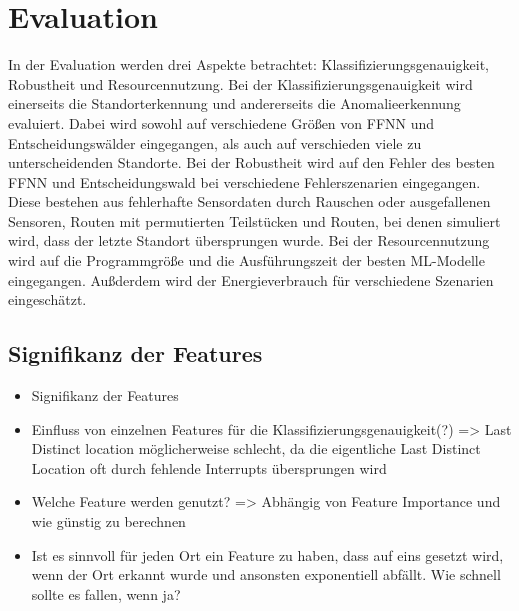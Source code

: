 \chapter{Evaluation}
In der Evaluation werden drei Aspekte betrachtet: Klassifizierungsgenauigkeit, Robustheit und Resourcennutzung.
Bei der Klassifizierungsgenauigkeit wird einerseits die Standorterkennung und andererseits die Anomalieerkennung evaluiert.
Dabei wird sowohl auf verschiedene Größen von FFNN und Entscheidungswälder eingegangen,
als auch auf verschieden viele zu unterscheidenden Standorte.
\newline
\newline
Bei der Robustheit wird auf den Fehler des besten FFNN und Entscheidungswald bei verschiedene Fehlerszenarien eingegangen.
Diese bestehen aus fehlerhafte Sensordaten durch Rauschen oder ausgefallenen Sensoren,
Routen mit permutierten Teilstücken und Routen, bei denen simuliert wird, dass der letzte Standort übersprungen wurde.
\newline
\newline
Bei der Resourcennutzung wird auf die Programmgröße und die Ausführungszeit der besten ML-Modelle eingegangen.
Außderdem wird der Energieverbrauch für verschiedene Szenarien eingeschätzt.





\section{Signifikanz der Features}
\begin{itemize}
    \item Signifikanz der Features
    \item Einfluss von einzelnen Features für die Klassifizierungsgenauigkeit(?) => Last Distinct location möglicherweise schlecht, da die eigentliche Last Distinct Location oft durch fehlende Interrupts übersprungen wird
    \item Welche Feature werden genutzt? => Abhängig von Feature Importance und wie günstig zu berechnen
    \item Ist es sinnvoll für jeden Ort ein Feature zu haben, dass auf eins gesetzt wird, wenn der Ort erkannt wurde und ansonsten exponentiell abfällt. Wie schnell sollte es fallen, wenn ja?
\end{itemize}

